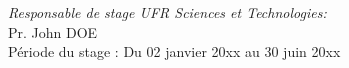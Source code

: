 \begin{titlepage}
{\large \emph{Responsable de stage UFR Sciences et Technologies:}}\\[0.2cm]
{\large Pr. John \textsc{DOE} }\\[0.4cm] %
	{\large Période du stage : Du 02 janvier 20xx au 30 juin 20xx}\\[1cm] %
	
	\vfill %
	
\end{titlepage}

